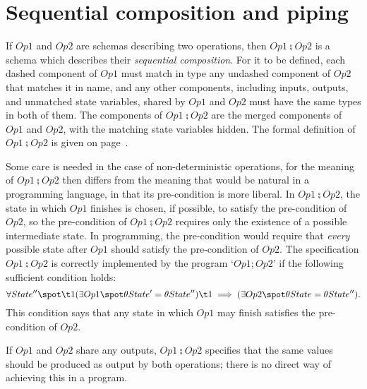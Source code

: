 \section{Sequential composition and piping}

If $Op1$ and $Op2$ are schemas describing two operations, then 
$Op1 \semi Op2$ is a schema which describes their {\em sequential
composition}.\symdex{$\semi$}%
For it to be defined, each dashed component of $Op1$ must match in
type any undashed component of $Op2$ that matches it in name, and any
other components, including inputs, outputs, and unmatched state
variables, shared by $Op1$ and $Op2$ must have the same types in both
of them.  The components of $Op1 \semi Op2$ are the merged
components of $Op1$ and $Op2$, with the matching state variables
hidden.  The formal definition of $Op1 \semi Op2$ is given on
page~\pageref{p:opcomp}.

Some care is needed in the case of
non-deterministic operations, for the meaning
of $Op1 \semi Op2$ then differs from the meaning that would be
natural in a programming language, in that its pre-condition is more
liberal.  In $Op1 \semi Op2$, the state in which $Op1$ finishes is
chosen, if possible, to satisfy the pre-condition of $Op2$, so the
pre-condition of $Op1 \semi Op2$ requires only the existence of a
possible intermediate state. In programming, the pre-condition would
require that {\em every} possible state after $Op1$ should satisfy
the pre-condition of $Op2$. The specification $Op1 \semi Op2$ is correctly
implemented by the program `$Op1; Op2$' if the following sufficient condition
holds:
\[
	\forall State'' \spot \\
\t1	    (\exists Op1 \spot \theta State' = \theta State'') \\
\t1	    \implies (\exists Op2 \spot \theta State = \theta State'').
\]
This condition says that any state in which $Op1$ may finish
satisfies the pre-condition of $Op2$.

If $Op1$ and $Op2$ share any outputs, $Op1 \semi Op2$ specifies that
the same values should be produced as output by both operations; there
is no direct way of achieving this in a program.

